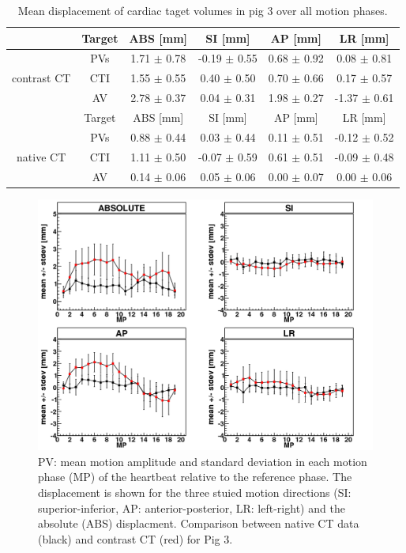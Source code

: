 \documentclass[type=dr, dr=rernat, accentcolor=tud7b,colorbacktitle, bigchapter, openright, twoside, 12pt ]{tudthesis}
\begin{document}
\begin{table}[H]
  \centering
  \small
  \caption{Mean displacement of cardiac taget volumes in pig 3 over all motion phases.}
  \begin{tabular}{|c|c|c|c|c|c|}
    \hline\hline
    & Target & ABS [mm] & SI [mm] & AP [mm] & LR [mm] \\
    \hline
    & PVs & 1.71 $\pm$ 0.78 & -0.19 $\pm$ 0.55 & 0.68 $\pm$ 0.92 & 0.08 $\pm$ 0.81 \\
    contrast CT & CTI & 1.55 $\pm$ 0.55 & 0.40 $\pm$ 0.50 & 0.70 $\pm$ 0.66 & 0.17 $\pm$ 0.57 \\
    & AV &  2.78 $\pm$ 0.37 & 0.04 $\pm$ 0.31 & 1.98 $\pm$ 0.27 & -1.37 $\pm$ 0.61 \\
    \hline\hline
    & Target & ABS [mm] & SI [mm] & AP [mm] & LR [mm] \\
   \hline
    & PVs & 0.88 $\pm$ 0.44 & 0.03 $\pm$ 0.44 & 0.11 $\pm$ 0.51 & -0.12 $\pm$ 0.52 \\
    native CT & CTI & 1.11 $\pm$ 0.50 & -0.07 $\pm$ 0.59 & 0.61 $\pm$ 0.51 & -0.09 $\pm$ 0.48 \\
    & AV & 0.14 $\pm$ 0.06 & 0.05 $\pm$ 0.06 & 0.00 $\pm$ 0.07 & 0.00 $\pm$ 0.06 \\
    \hline\hline
  \end{tabular}
  \label{tab:motion_native_vs_contrast}
\end{table}


\newpage

\begin{figure}[H]
\begin{center}
 \includegraphics[scale=0.22]{Mayo_IPV_HB_NATIV_VS_CONTRAST.png}
\caption{PV: mean motion amplitude and standard deviation in each motion phase (MP) of the heartbeat relative to the reference phase. The 
displacement is shown for the three stuied motion directions (SI: superior-inferior, AP: anterior-posterior, LR: left-right) and the absolute 
(ABS) displacment. Comparison between native CT data (black) and contrast CT (red) for Pig 3.}
\label{motion_hb_pv_contrast_native}
\end{center}
\end{figure}
\end{document}
